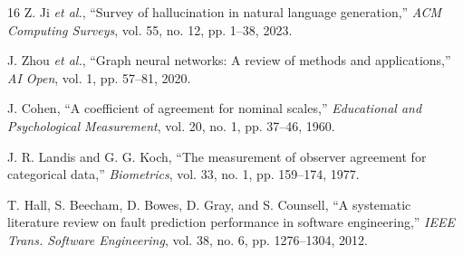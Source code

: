 \documentclass[conference]{IEEEtran}
\begin{document}
\begin{thebibliography}{16}
 Z. Ji \emph{et al.}, ``Survey of hallucination in
natural language generation,'' \emph{ACM Computing Surveys}, vol. 55, no. 12, pp.
1--38, 2023.

 J. Zhou \emph{et al.}, ``Graph neural networks: A review of
methods and applications,'' \emph{AI Open}, vol. 1, pp. 57--81, 2020.

 J. Cohen, ``A coefficient of agreement for nominal scales,''
\emph{Educational and Psychological Measurement}, vol. 20, no. 1, pp. 37--46, 1960.

 J. R. Landis and G. G. Koch, ``The measurement of observer
agreement for categorical data,'' \emph{Biometrics}, vol. 33, no. 1, pp. 159--174,
1977.

 T. Hall, S. Beecham, D. Bowes, D. Gray, and S.
Counsell, ``A systematic literature review on fault prediction performance in
software engineering,'' \emph{IEEE Trans. Software Engineering}, vol. 38, no. 6,
pp. 1276--1304, 2012.

\end{thebibliography}
\end{document}
